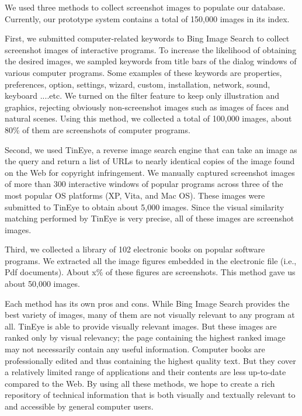 \documentclass{www2010-submission}
\begin{document}

We used three methods to collect screenshot images to populate our
database. Currently, our prototype system contains a total of
150,000 images in its index.

First, we submitted computer-related keywords to Bing Image Search
to collect screenshot images of interactive programs. To increase
the likelihood of obtaining the desired images, we sampled
keywords from title bars of the dialog windows of various computer
programs. Some examples of these keywords are properties,
preferences, option, settings, wizard, custom, installation,
network, sound, keyboard ....etc. We turned on the filter feature
to keep only illustration and graphics, rejecting obviously
non-screenshot images such as images of faces and natural scenes.
Using this method, we collected a total of 100,000 images, about
80\% of them are screenshots of computer programs.

Second, we used TinEye, a reverse image search engine that can
take an image as the query and return a list of URLs to nearly
identical copies of the image found on the Web for copyright
infringement. We manually captured screenshot images of more than
300 interactive windows of popular programs across three of the
most popular OS platforms (XP, Vita, and Mac OS). These images
were submitted to TinEye to obtain about 5,000 images. Since the
visual similarity matching performed by TinEye is very precise,
all of these images are screenshot images.

Third, we collected a library of 102 electronic books on popular
software programs. We extracted all the image figures embedded in
the electronic file (i.e., Pdf documents). About x\% of these
figures are screenshots. This method gave us about 50,000 images.

Each method has its own pros and cons. While Bing Image Search
provides the best variety of images, many of them are not visually
relevant to any program at all. TinEye is able to provide visually
relevant images. But these images are ranked only by visual
relevancy; the page containing the highest ranked image may not
necessarily contain any useful information. Computer books are
professionally edited and thus containing the highest quality
text. But they cover a relatively limited range of applications
and their contents are less up-to-date compared to the Web. By
using all these methods, we hope to create a rich repository of
technical information that is both visually and textually relevant
to and accessible by general computer users.
\end{document}
